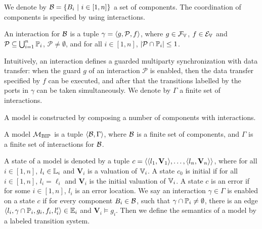 %

We denote by $\mathcal{B} = \{B_{i} ~|~ i\in [1,n]\}$ a set of components.
%
The coordination of components is specified by using interactions.

\begin{definition} [Interaction]
	\label{interaction}
	An interaction for $\mathcal{B} $ is a tuple $\gamma = \langle{g, \mathcal{P}, f }\rangle $,
	where $g \in \mathcal{F}_{\mathbb{V}_{}}$, $f\in \mathcal{E}_{\mathbb{V}_{}}$ and
	$\mathcal{P} \subseteq \bigcup_{i=1}^n \mathbb{P}_{i}$, $\mathcal{P} \neq \emptyset$, and
	for all $i \in [1, n]$, $|\mathcal{P} \cap \mathbb{P}_{i}| \le 1$.
\end{definition}

Intuitively, an interaction defines a guarded multiparty synchronization with data transfer:
when the guard $g$ of an interaction $\mathcal{P}$ is enabled,
then the data transfer specified by $f$ can be executed, and
after that the transitions labelled by the ports in $\gamma$ can be taken simultaneously.
We denote by $\Gamma$ a finite set of interactions.

A \BIP model is constructed by composing a number of components with interactions.

\begin{definition} 
	A \BIP model $\mathcal{M}_{\textsc{BIP}}$ is a tuple $\langle{\ensuremath{\mathcal{B}},\Gamma}\rangle$,
	where $\mathcal{B}$ is a finite set of components,
	and $\Gamma$ is a finite set of interactions for $\mathcal{B}$.
\end{definition}



A state of a \BIP model is denoted by a tuple $c = \langle \langle l_{1}, \mathbf{V}_{1} \rangle, \ldots, \langle l_{n}, \mathbf{V}_{n} \rangle \rangle $,
where for all $i \in [1,n] $, $l_i \in \mathbb{L}_{i} $ and $\mathbf{V}_i $ is a valuation of $\mathbb{V}_{i}$.
%
A state $c_{0}$ is initial if for all $i \in [1,n]$,
$l_i = \ell_{i}$ and $\mathbf{V}_{i}$ is the initial valuation of $\mathbb{V}_{i}$.
%
A state $c$ is an error if for some $i \in [1,n]$, $l_{i}$ is an error location.
%
We say an interaction $\gamma \in \Gamma$ is enabled on a state $c$ if
for every component $B_{i} \in \mathcal{B}$,
such that $\gamma \cap \mathbb{P}_{i} \neq \emptyset$,
%
there is an edge $\langle{l_i, \gamma \cap \ensuremath{\mathbb{P}_{i}}, g_i, f_i, l_{i}' }\rangle \in \mathbb{E}_{i}$
and  $\mathbf{V}_{i} \models g_i $.
%
Then we define the semantics of a \BIP model by a labeled transition system.

